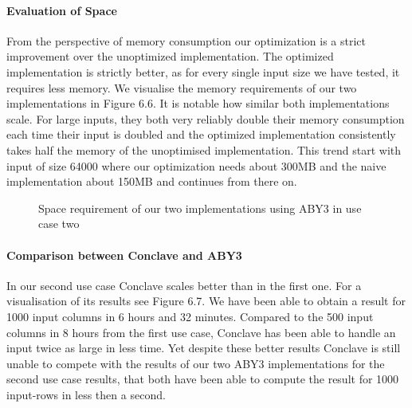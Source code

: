 \paragraph{Evaluation of Space}
From the perspective of memory consumption our optimization is a strict improvement over the unoptimized implementation.
The optimized implementation is strictly better, as for every single input size we have tested, it requires less memory. We visualise the memory requirements of our two implementations in Figure 6.6.
It is notable how similar both implementations scale. For large inputs, they both very reliably double their memory consumption each time their input is doubled and the optimized implementation consistently takes half the memory of the unoptimised implementation. This trend start with input of size 64000 where our optimization needs about 300MB and the naive implementation about 150MB and continues from there on.
\begin{figure}[H]
	\caption{Space requirement of our two implementations using ABY3 in use case two}
\end{figure}
\paragraph{Comparison between Conclave and ABY3}
In our second use case Conclave scales better than in the first one. For a visualisation of its results see Figure 6.7. We have been able to obtain a result for 1000 input columns in 6 hours and 32 minutes. Compared to the 500 input columns in 8 hours from the first use case, Conclave has been able to handle an input twice as large in less time. Yet despite these better results Conclave is still unable to compete with the results of our two ABY3 implementations for the second use case results, that both have been able to compute the result for 1000 input-rows in less then a second.

